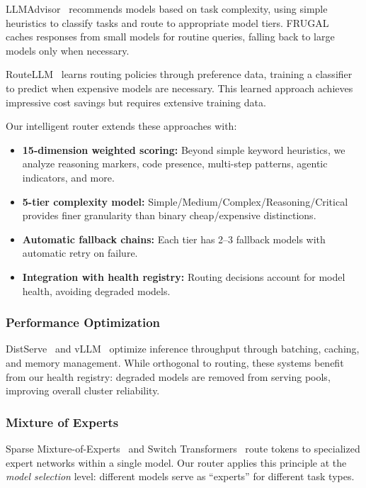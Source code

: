 \documentclass{article}
\begin{document}
LLMAdvisor~\cite{liu2023llm} recommends models based on task complexity, using simple heuristics to classify tasks and route to appropriate model tiers. FRUGAL~\cite{lyu2023frugal} caches responses from small models for routine queries, falling back to large models only when necessary.

RouteLLM~\cite{li2024routellm} learns routing policies through preference data, training a classifier to predict when expensive models are necessary. This learned approach achieves impressive cost savings but requires extensive training data.

Our intelligent router extends these approaches with:

\begin{itemize}[leftmargin=*]
    \item \textbf{15-dimension weighted scoring:} Beyond simple keyword heuristics, we analyze reasoning markers, code presence, multi-step patterns, agentic indicators, and more.
    
    \item \textbf{5-tier complexity model:} Simple/Medium/Complex/Reasoning/Critical provides finer granularity than binary cheap/expensive distinctions.
    
    \item \textbf{Automatic fallback chains:} Each tier has 2--3 fallback models with automatic retry on failure.
    
    \item \textbf{Integration with health registry:} Routing decisions account for model health, avoiding degraded models.
\end{itemize}

\subsubsection{Performance Optimization}

DistServe~\cite{zheng2023distserve} and vLLM~\cite{kwon2023efficient} optimize inference throughput through batching, caching, and memory management. While orthogonal to routing, these systems benefit from our health registry: degraded models are removed from serving pools, improving overall cluster reliability.

\subsubsection{Mixture of Experts}

Sparse Mixture-of-Experts~\cite{shazeer2017outrageously} and Switch Transformers~\cite{fedus2022switch} route tokens to specialized expert networks within a single model. Our router applies this principle at the \textit{model selection} level: different models serve as ``experts'' for different task types.
\end{document}
